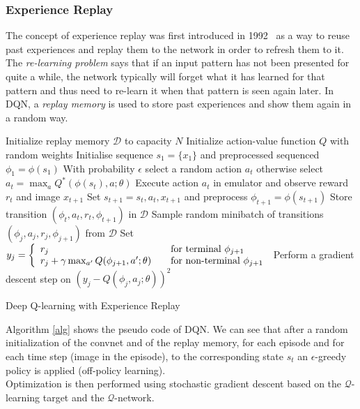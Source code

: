 \subsubsection{Experience Replay}
The concept of experience replay was first introduced in 1992~\cite{Lin1992} as a way to reuse past experiences and replay them to the network in order to refresh them to it. The \textit{re-learning problem} says that  if an input pattern has not been presented for quite a while, the
network typically will forget what it has learned for that pattern and thus need to re-learn it when that pattern is seen again later. In DQN, a \textit{replay memory} is used to store past experiences and show them again in a random way.
\begin{spacing}{1.15}
\begin{algorithm}[ht]
\begin{algorithmic}
\State Initialize replay memory $\mathcal{D}$ to capacity $N$
\State Initialize action-value function $Q$ with random weights
\State Initialise sequence $s_1 = \{x_1\}$ and preprocessed sequenced $\phi_1 = \phi(s_1)$
	\State With probability $\epsilon$ select a random action $a_t$
	\State otherwise select $a_t = \max_{a} Q^*(\phi(s_t), a; \theta)$
	\State Execute action $a_t$ in emulator and observe reward $r_t$ and image $x_{t+1}$
	\State Set $s_{t+1} = s_t,a_t,x_{t+1}$ and preprocess $\phi_{t+1} = \phi(s_{t+1})$
	\State Store transition $\left(\phi_t,a_t,r_t,\phi_{t+1}\right)$ in $\mathcal{D}$
	\State Sample random minibatch of transitions $\left(\phi_j,a_j,r_j,\phi_{j+1}\right)$ from $\mathcal{D}$
	\State Set
	$y_j =
    \left\{
    \begin{array}{l l}
      r_j  \quad & \text{for terminal } \phi_{j+1}\\
      r_j + \gamma \max_{a'} Q(\phi_{j+1}, a'; \theta) \quad & \text{for non-terminal } \phi_{j+1}
    \end{array} \right.$
	\State Perform a gradient descent step on $\left(y_j - Q(\phi_j, a_j; \theta) \right)^2$
\EndFor
\EndFor
\end{algorithmic}
\caption{Deep Q-learning with Experience Replay}
\label{alg}
\end{algorithm}
\end{spacing}

\noindent
Algorithm \ref{alg} shows the pseudo code of DQN. We can see that after a random initialization of the convnet and of the replay memory, for each episode and for each time step (image in the episode), to the corresponding state $s_t$ an $\epsilon$-greedy policy is applied (off-policy learning). \\
Optimization is then performed using stochastic gradient descent based on the $\mathcal{Q}$-learning target and the $\mathcal{Q}$-network.

